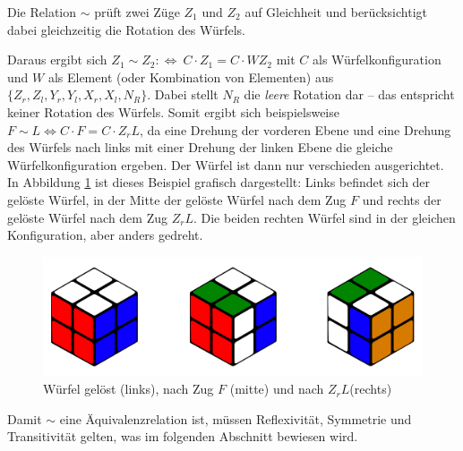 \documentclass[12pt,a4paper, usenames, dvipsnames]{article}
\theoremstyle{mystyle}
\theoremstyle{definition}
\begin{document}
Die Relation $\sim$ prüft zwei Züge $Z_1$ und $Z_2$ auf Gleichheit und berücksichtigt dabei gleichzeitig die Rotation des Würfels.

Daraus ergibt sich $Z_1 \sim Z_2 :\Leftrightarrow \ C \cdot Z_1 = C \cdot WZ_2$ mit $C$ als Würfelkonfiguration und $W$ als Element (oder Kombination von Elementen) aus $\{{Z_r}, {Z_l}, {Y_r}, {Y_l}, {X_r}, {X_l}, N_R\}$. Dabei stellt $N_R$ die \textit{leere} Rotation dar -- das entspricht keiner Rotation des Würfels. 
Somit ergibt sich beispielsweise $F \sim L \Leftrightarrow C \cdot F = C \cdot Z_rL$, da eine Drehung der vorderen Ebene und eine Drehung des Würfels nach links mit einer Drehung der linken Ebene die gleiche Würfelkonfiguration ergeben. Der Würfel ist dann nur verschieden ausgerichtet. 
In Abbildung \ref{Abbildung_GelöstnachFnachZL} ist dieses Beispiel grafisch dargestellt: Links befindet sich der gelöste Würfel, in der Mitte der gelöste Würfel nach dem Zug $F$ und rechts der gelöste Würfel nach dem Zug $Z_rL$. Die beiden rechten Würfel sind in der gleichen Konfiguration, aber anders gedreht.
\begin{figure}[h]
\centering
\includegraphics[scale=0.15]{3_wuerfel.png}
\caption[Würfel gelöst, nach Zug $F$ und nach $Z_rL$]{Würfel gelöst (links), nach Zug $F$ (mitte) und nach $Z_rL$(rechts)}
\label{Abbildung_GelöstnachFnachZL}
\end{figure}

Damit $\sim$ eine Äquivalenzrelation ist, müssen Reflexivität, Symmetrie und Transitivität gelten, was im folgenden Abschnitt bewiesen wird.
\end{document}
